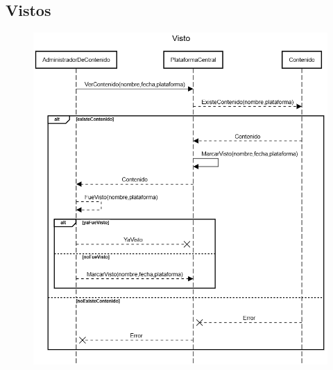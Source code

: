 \clearpage

\subsection{Vistos}\label{subsec:vistos}
\begin{figure}[h]
    \centering
    \includegraphics[width=1\textwidth]{img/visto}
\end{figure}

\clearpage


